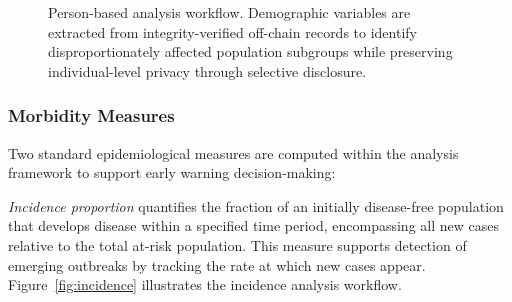 \documentclass[AMA,LATO1COL]{WileyNJD-v2}
\begin{document}
\begin{figure}[!ht]
\centering
{}
\caption{Person-based analysis workflow. Demographic variables are extracted from integrity-verified off-chain records to identify disproportionately affected population subgroups while preserving individual-level privacy through selective disclosure.}\label{fig:person}
\end{figure}
%
%
%

\subsubsection{Morbidity Measures}\label{subsubsec:morbidity}

Two standard epidemiological measures are computed within the analysis framework to support early warning decision-making:

\textit{Incidence proportion} quantifies the fraction of an initially disease-free population that develops disease within a specified time period, encompassing all new cases relative to the total at-risk population.\cite{cdc2012principles} This measure supports detection of emerging outbreaks by tracking the rate at which new cases appear. Figure~\ref{fig:incidence} illustrates the incidence analysis workflow.
\end{document}
